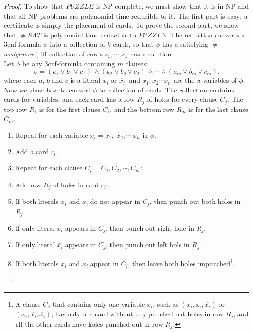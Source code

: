 \documentclass[11pt]{article}
\begin{document}
\begin{proof}
To show that $PUZZLE$ is NP-complete, we must show that it is in NP and that all NP-problems are polynomial time reducible to it. The first part is easy; a certificate is simply the placement of cards. To prove the second part, we show that $\neq$\textit{SAT} is polynomial time reducible to $PUZZLE$. The reduction converts a 3cnf-formula $\phi$ into a collection of $k$ cards, so that $\phi$ has a satisfying $\neq$\textit{-assignment}, iff collection of cards $c_1,\cdots, c_k$ has a solution. \\

Let $\phi$ be any 3cnf-formula containing $m$ clauses:
\[
\phi = (a_1 \vee b_1 \vee c_1) \ \wedge (a_2 \vee b_2 \vee c_2) \ \wedge \cdots \wedge (a_m \vee b_m \vee c_m).
\]
where each $a$, $b$ and $c$ is a literal $x_i$ or $\overline{x_i}$, and $x_1, x_2 \cdots x_n$ are the $n$ variables of $\phi$. Now we show how to convert $\phi$ to collection of cards. The collection contains cards for variables, and each card has a row $R_j$ of holes for every clause $C_j$. The top row $R_1$ is for the first clause $C_1$, and the bottom row $R_m$ is for the last clause $C_m$.

\begin{enumerate}
\item Repeat for each variable $x_i = x_1, \ x_2, \cdots \ x_n$ in $\phi$.
\item \hspace*{0.5cm} Add a card $c_i$.
\item \hspace*{0.5cm} Repeat for each clause $C_j = C_1, C_2, \cdots, C_m$:
\item \hspace*{1.2cm} Add row $R_j$ of holes in card $c_i$.
\item \hspace*{1.2cm} If both literals $x_i$ and $\overline{x_i}$ do not appear in $C_j$, then punch out both holes in $R_j$.
\item \hspace*{1.2cm} If only literal $x_i$ appears in $C_j$, then punch out right hole in $R_j$.
\item \hspace*{1.2cm} If only literal $\overline{x_i}$ appears in $C_j$, then punch out left hole in $R_j$.
\item \hspace*{1.2cm} If both literals $x_i$ and $\overline{x_i}$ appear in $C_j$, then leave both holes unpunched\footnote{A clause $C_j$ that contains only one variable $x_i$, such as $(x_i,x_i,\overline{x_i})$ or $(x_i,\overline{x_i},\overline{x_i})$, has only one card without any punched out holes in row $R_j$, and all the other cards have holes punched out in row $R_j$.}.
\end{enumerate}


\end{proof}
\end{document}
